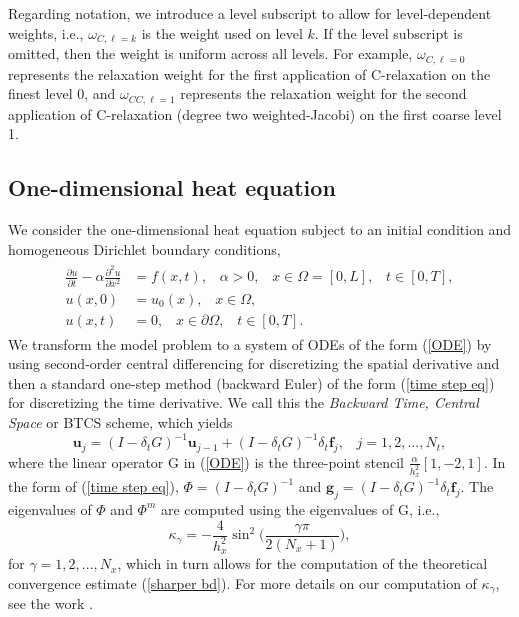 \documentclass[VANCOUVER,STIX1COL]{WileyNJD-v2}
\begin{document}
Regarding notation, we introduce a level subscript to allow for level-dependent
weights, i.e., $\omega_{C,\ell=k}$ is the weight used on level $k$.  If the
level subscript is omitted, then the weight is uniform across all levels.
For example, $\omega_{C,\ell=0}$ represents the relaxation weight for the first
application of C-relaxation on the finest level 0, and $\omega_{CC,\ell=1}$
represents the relaxation weight for the second application of C-relaxation
(degree two weighted-Jacobi) on the first coarse level 1.

\subsection{One-dimensional heat equation}
\label{sec:results_heat}
We consider the one-dimensional heat equation subject to an initial condition and homogeneous Dirichlet boundary conditions,
\begin{align}
\begin{split}
\frac{\partial u}{\partial t} - \alpha \frac{\partial^2 u}{\partial x^2} &= f(x,t), \hspace{10pt} \alpha > 0, \hspace{10pt} x \in \Omega = [0, L], \hspace{10pt} t \in [0, T], \\
u(x, 0) &= u_0(x), \hspace{10pt} x \in \Omega, \\
u(x, t) &= 0, \hspace{10pt} x \in \partial \Omega, \hspace{10pt} t \in [0, T].
\end{split}
\end{align}
We transform the model problem to a system of ODEs of the form (\ref{ODE}) by using second-order central differencing for discretizing the spatial derivative and then a standard one-step method (backward Euler) of the form (\ref{time step eq}) for discretizing the time derivative.  We call this the \textit{Backward Time, Central Space} or BTCS scheme, which yields
\begin{equation}
\mathbf{u}_j = (I - \delta_t G)^{-1} \mathbf{u}_{j-1} + (I - \delta_t G)^{-1} \delta_t \mathbf{f}_j, \hspace{10pt} j=1,2,...,N_t,
\end{equation}
where the linear operator G in (\ref{ODE}) is the three-point stencil $\frac{\alpha}{h_x^2} [1, -2, 1]$. In 
the form of (\ref{time step eq}), $\Phi = (I - \delta_t G)^{-1}$ and $\mathbf{g}_j = (I - \delta_t G)^{-1} 
\delta_t \mathbf{f}_j $.
The eigenvalues of $\Phi$ and $\Phi^m$ are computed using the eigenvalues of G, i.e.,
$$\kappa_{\gamma} = -\frac{4}{h_x^2} \sin^2 \Big(\frac{\gamma \pi}{2(N_x + 1)}\Big),$$
for $\gamma = 1, 2, ..., N_x$, 
which in turn allows for the computation of the theoretical convergence estimate (\ref{sharper bd}).
For more details on our computation of $\kappa_{\gamma}$, see the work \cite{Do2016}.
\end{document}
